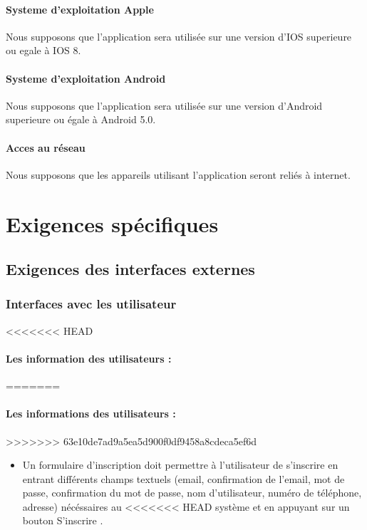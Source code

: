 \documentclass{article}
\begin{document}
\begin{itemize}
\paragraph{Systeme d'exploitation Apple}
Nous supposons que l'application sera utilisée sur une version d'IOS superieure ou egale à IOS 8.
\paragraph{Systeme d'exploitation Android}
Nous supposons que l'application sera utilisée sur une version d'Android superieure ou égale à Android 5.0.
\paragraph{Acces au réseau}
Nous supposons que les appareils utilisant l'application seront reliés à internet.

\section{Exigences spécifiques}
\subsection{Exigences des interfaces externes}
\subsubsection{Interfaces avec les utilisateur}
<<<<<<< HEAD
\paragraph{Les information des utilisateurs :}
=======
\paragraph{Les informations des utilisateurs :}
>>>>>>> 63e10de7ad9a5ea5d900f0df9458a8cdeca5ef6d
\begin{itemize}
 \item Un formulaire d'inscription doit permettre à l'utilisateur de
   s'inscrire en entrant différents champs textuels (email,
   confirmation de l'email, mot de
   passe, confirmation du mot de passe, nom d'utilisateur, numéro de téléphone, adresse) nécéssaires au
<<<<<<< HEAD
   système et en appuyant sur
   un bouton \og S'inscrire \fg{}.


\end{itemize}
\end{itemize}
\end{document}
